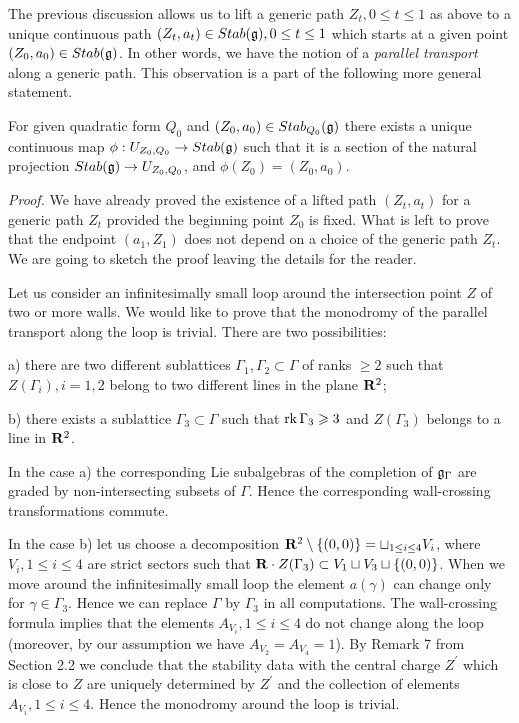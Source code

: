 \documentclass[12pt]{article}
\begin{document}
The previous discussion allows us to lift a generic path $Z_t, 0\le t\le 1$ as above to
a unique continuous path $(Z_t,a_t)\in Stab({\mathfrak g}), 0\le t\le 1$ which starts at a given point $(Z_0,a_0)\in Stab({\mathfrak g})$.
In other words, we have the notion of a {\it parallel transport} along a generic  path.
This observation is a part of the following more general statement.

\begin{thm} For given quadratic form  $Q_0$ and $(Z_0,a_0)\in Stab_{Q_0}({\mathfrak g})$ there exists a unique continuous map $\phi: U_{Z_0,Q_0}\to Stab({\mathfrak g})$ such that it is a section of the natural projection $Stab({\mathfrak g})\to U_{Z_0, Q_0}$, and  $\phi(Z_0)=(Z_0,a_0)$.


\end{thm}

{\it Proof.} We have already proved the existence of a lifted path $(Z_t,a_t)$ for a generic path $Z_t$ provided the beginning point $Z_0$ is fixed.
What is left to prove that the endpoint $(a_1,Z_1)$  does not depend on a choice of the generic path $Z_t$. We are going to sketch the proof leaving the details for the reader.

Let us consider an infinitesimally small loop around the intersection point $Z$ of two or more walls. We would like to prove that the monodromy of the parallel transport along the loop is trivial.
There are two possibilities:

a) there are two different sublattices $\Gamma_1,\Gamma_2\subset \Gamma$ of ranks $\geqslant 2$ such that $Z(\Gamma_i), i=1,2$ belong to two different lines in the plane ${\bf R}^2$;

b) there exists a sublattice $\Gamma_3\subset \Gamma$ such that $\operatorname{rk}\Gamma_3\geqslant 3$ and $Z(\Gamma_3)$ belongs to a line in ${\bf R}^2$.

In the case a) the corresponding Lie subalgebras of the completion of ${\mathfrak g}_{\Gamma}$ are graded by non-intersecting subsets of $\Gamma$. Hence the corresponding wall-crossing transformations commute.

In the case b) let us choose a decomposition ${\bf R}^2\setminus \{(0,0)\}=\sqcup_{1\le i\le 4}V_i$, where $V_i, 1\le i\le 4$ are strict sectors such that ${\bf R}\cdot Z(\Gamma_3)\subset V_1\sqcup V_3\sqcup \{(0,0)\}$. When we move around the infinitesimally small loop the element $a(\gamma)$ can change only for $\gamma\in \Gamma_3$. Hence we can replace $\Gamma$ by $\Gamma_3$ in all computations. The wall-crossing formula implies that the elements $A_{V_i}, 1\le i\le 4$ do not change along the loop (moreover, by our assumption we have $A_{V_2}=A_{V_4}=1$). By Remark 7
from Section 2.2 we conclude that the stability data with the central charge $Z^{\prime}$ which is close to $Z$ are uniquely determined by $Z^{\prime}$ and the collection of elements $A_{V_i}, 1\le i\le 4$.
Hence the monodromy around the loop is trivial.
\end{document}
